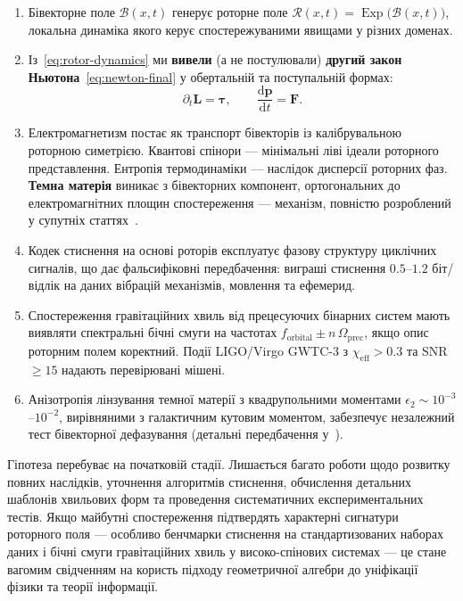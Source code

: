 \documentclass[11pt,a4paper]{article}
\newcommand{\Exp}{\operatorname{Exp}}
\newcommand{\Rotor}{\mathcal{R}}
\newcommand{\Biv}{\mathcal{B}}
\theoremstyle{definition}
\theoremstyle{plain}
\theoremstyle{remark}
\begin{document}
\begin{enumerate}
  \item Бівекторне поле $\Biv(x,t)$ генерує роторне поле $\Rotor(x,t)=\Exp\!\big(\Biv(x,t)\big)$, локальна динаміка якого керує спостережуваними явищами у різних доменах.
  \item Із~\eqref{eq:rotor-dynamics} ми \textbf{вивели} (а не постулювали) \textbf{другий закон Ньютона}~\eqref{eq:newton-final} у обертальній та поступальній формах:
  \begin{equation*}
  \partial_t \bm{L} = \bm{\tau}, \qquad \frac{\mathrm{d}\mathbf{p}}{\mathrm{d}t} = \mathbf{F}.
  \end{equation*}
  \item Електромагнетизм постає як транспорт бівекторів із калібрувальною роторною симетрією. Квантові спінори — мінімальні ліві ідеали роторного представлення. Ентропія термодинаміки — наслідок дисперсії роторних фаз. \textbf{Темна матерія} виникає з бівекторних компонент, ортогональних до електромагнітних площин спостереження — механізм, повністю розроблений у супутніх статтях~\cite{DarkMatterPaper}.
  \item Кодек стиснення на основі роторів експлуатує фазову структуру циклічних сигналів, що дає фальсифіковні передбачення: виграші стиснення $0.5$–$1.2$ біт/відлік на даних вібрацій механізмів, мовлення та ефемерид.
  \item Спостереження гравітаційних хвиль від прецесуючих бінарних систем мають виявляти спектральні бічні смуги на частотах $f_{\text{orbital}} \pm n\,\Omega_{\text{prec}}$, якщо опис роторним полем коректний. Події LIGO/Virgo GWTC-3 з $\chi_{\text{eff}} > 0.3$ та SNR $\ge 15$ надають перевірювані мішені.
  \item Анізотропія лінзування темної матерії з квадрупольними моментами $\epsilon_2 \sim 10^{-3}$--$10^{-2}$, вирівняними з галактичним кутовим моментом, забезпечує незалежний тест бівекторної дефазування (детальні передбачення у~\cite{DarkMatterPaper}).
\end{enumerate}

Гіпотеза перебуває на початковій стадії. Лишається багато роботи щодо розвитку повних наслідків, уточнення алгоритмів стиснення, обчислення детальних шаблонів хвильових форм та проведення систематичних експериментальних тестів. Якщо майбутні спостереження підтвердять характерні сигнатури роторного поля — особливо бенчмарки стиснення на стандартизованих наборах даних і бічні смуги гравітаційних хвиль у високо-спінових системах — це стане вагомим свідченням на користь підходу геометричної алгебри до уніфікації фізики та теорії інформації.
\end{document}

